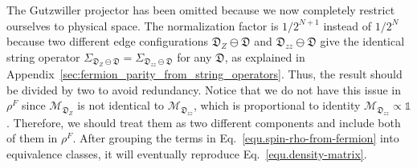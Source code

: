 The Gutzwiller projector has been omitted because we now completely restrict ourselves to physical space. The normalization factor is $1/2^{N+1}$ instead of $1/2^{N}$ because two different edge configurations $\mathfrak{D}_Z\ominus\mathfrak{D}$ and $\mathfrak{D}_{zz}\ominus\mathfrak{D}$ give the identical string operator $\Sigma_{\mathfrak{D}_Z\ominus\mathfrak{D}} = \Sigma_{\mathfrak{D}_{zz}\ominus\mathfrak{D}}$ for any $\mathfrak{D}$, as explained in Appendix~\ref{sec:fermion_parity_from_string_operators}. Thus, the result should be divided by two to avoid redundancy. Notice that we do not have this issue in $\rho^F$ since $\mathcal{M}_{\mathfrak{D}_Z}$ is not identical to $\mathcal{M}_{\mathfrak{D}_{zz}}$, which is proportional to identity $\mathcal{M}_{\mathfrak{D}_{zz}}\propto\mathds{1}$. Therefore, we should treat them as two different components and include both of them in $\rho^F$. After grouping the terms in Eq.~\eqref{equ.spin-rho-from-fermion} into equivalence classes, it will eventually reproduce Eq.~\eqref{equ.density-matrix}. 

